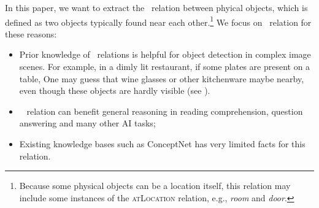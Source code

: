 In this paper, we want to extract the \lnear\ relation between
phyical objects, which is defined as two objects typically found near each
other.\footnote{Because some physical objects can be a location itself, this
relation may include some instances of the \textsc{atLocation} relation,
e.g., {\em room} and {\em door}.}
We focus on \lnear\ relation for these reasons:
\begin{itemize}
	\item Prior knowledge of \lnear\ relations is helpful for object detection in complex image scenes. 
	For example, in a dimly lit restaurant, if some plates are present on a table,
	One may guess that wine glasses or other kitchenware maybe nearby, 
	even though these objects are hardly visible (see ). 
	\item \lnear~ relation can benefit general reasoning in reading comprehension,
	question answering and many other AI tasks;
	\item Existing knowledge bases such as ConceptNet has very limited facts for
	this relation.
\end{itemize} 


%
%
%
%

